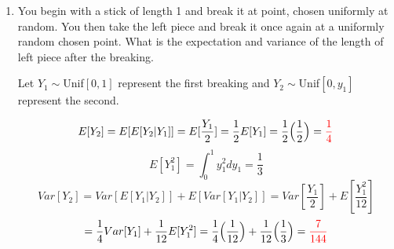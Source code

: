 \documentclass{article}
\begin{document}
\begin{enumerate}
\pagebreak
    \item You begin with a stick of length 1 and break it at point, chosen uniformly at random. You then take the left piece and break it once again at a uniformly random chosen point. What is the expectation and variance of the length of left piece after the breaking.
    \begin{center}
        Let $Y_1 \sim $\;Unif$[0,1]$ represent the first breaking and $Y_2 \sim $\;Unif$[0,y_1]$ represent the second.
    \end{center}
    \[
        E[Y_2] = E[E[Y_2|Y_1]]=E[\frac{Y_1}{2}]=\frac{1}{2}E[Y_1] = \frac{1}{2}\Big(\frac{1}{2}\Big) = \textcolor{red}{\frac{1}{4}}
    \]
    \[
        E[Y_1^2] = \int_0^1y_1^2dy_1 = \frac{1}{3}
    \]
    \[
        Var[Y_2] = Var[E[Y_1|Y_2]] + E[Var[Y_1|Y_2]] = Var[\frac{Y_1}{2}] + E[\frac{Y_1^2}{12}] 
    \]
    \[
        = \frac{1}{4}Var[Y_1] + \frac{1}{12}E[Y_1^2] = \frac{1}{4}\Big(\frac{1}{12}\Big) + \frac{1}{12}\Big(\frac{1}{3}\Big) = \textcolor{red}{\frac{7}{144}}
    \]
    


\end{enumerate}
\end{document}
